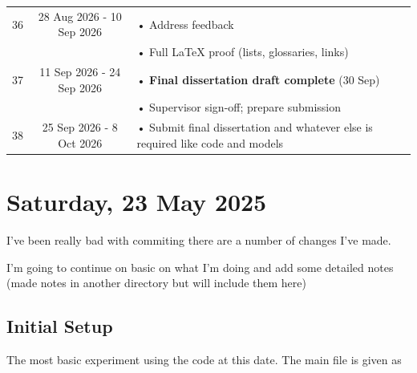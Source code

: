 \begin{longtable}{@{} c c p{10.5cm} @{}}
\midrule
36 & 28 Aug 2026 - 10 Sep 2026 & • Address feedback\\
   &                & • Full LaTeX proof (lists, glossaries, links)\\
\midrule
37 & 11 Sep 2026 - 24 Sep 2026 & • \textbf{Final dissertation draft complete} (30 Sep)\\
   &                & • Supervisor sign-off; prepare submission\\
\midrule
38 & 25 Sep 2026 - 8 Oct 2026 & • Submit final dissertation and whatever else is required like code and models\\
\end{longtable}

\section[2025/23/05]{Saturday, 23 May 2025}
\label{sec:20252305}

I've been really bad with commiting there are a number of changes I've made.

I'm going to continue on basic on what I'm doing and add some detailed notes
(made notes in another directory but will include them here)

\subsection{Initial Setup}

The most basic experiment using the code at this date. The main file is given as

